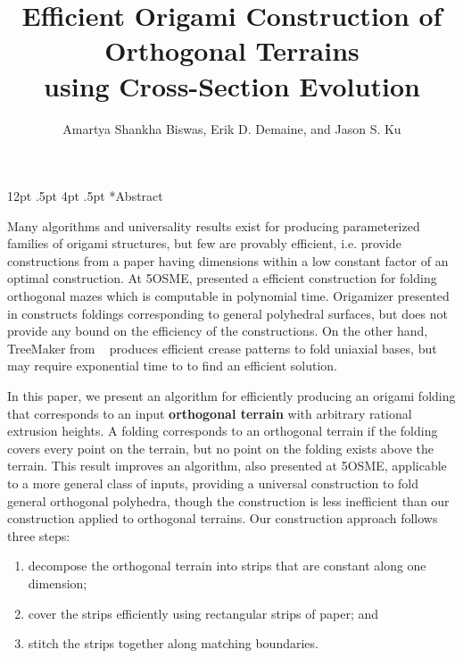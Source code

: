 \documentclass[a4paper,11pt]{article}
\title{Efficient Origami Construction of Orthogonal Terrains \\
using Cross-Section Evolution}
\author{Amartya Shankha Biswas, Erik D. Demaine, 
and Jason S. Ku}
\makeatletter
\renewcommand\section{\@startsection {section}{1}{\z@}%
                                   {12pt \@plus .5pt}%
                                   {4pt \@plus.5pt}%
                                   {\centering\normalfont\bfseries}}
\makeatother
\begin{document}
\maketitle


\section*{Abstract}

Many algorithms and universality results exist for producing parameterized
families of origami structures, but few are provably efficient, i.e. provide
constructions from a paper having dimensions within a low constant factor of an
optimal construction. At 5OSME, \cite{MazeFolding_Origami5} presented a
efficient construction for folding orthogonal mazes which is computable in
polynomial time. Origamizer presented in \cite{Origamizer_SoCG2017} constructs
foldings corresponding to general polyhedral surfaces, but does not provide any
bound on the efficiency of the constructions. On the other hand, TreeMaker from
~\cite{Lang} produces efficient crease patterns to fold uniaxial bases, but may
require exponential time to to find an efficient solution. 

In this paper, we present an algorithm for efficiently producing an origami
folding that corresponds to an input {\bf orthogonal terrain} with arbitrary
rational extrusion heights. A folding corresponds to an orthogonal terrain if
the folding covers every point on the terrain, but no point on the folding
exists above the terrain. This result improves an algorithm,
\cite{BoxPleating_Origami5} also presented at 5OSME, applicable to a more
general class of inputs, providing a universal construction to fold general
orthogonal polyhedra, though the construction is less inefficient than our
construction applied to orthogonal terrains. Our construction approach follows
three steps: 

\vspace{-0.2pc} 
\begin{enumerate} 
\item decompose the orthogonal terrain into strips that are constant along one
dimension; 
\item cover the strips efficiently using rectangular strips of paper; and 
\item stitch the strips together along matching boundaries. 
\end{enumerate}
\vspace{-0.2pc}
\end{document}
